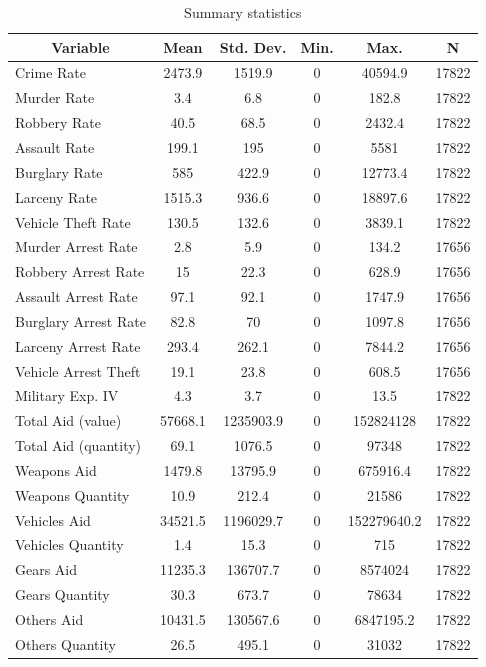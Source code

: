 
\begin{table}[htbp]\centering \caption{Summary statistics \label{sumstat}}
\begin{tabular}{l c c c c c}\hline\hline
\multicolumn{1}{c}{\textbf{Variable}} & \textbf{Mean}
 & \textbf{Std. Dev.}& \textbf{Min.} &  \textbf{Max.} & \textbf{N}\\ \hline
Crime Rate & 2473.9 & 1519.9 & 0 & 40594.9 & 17822\\
Murder Rate & 3.4 & 6.8 & 0 & 182.8 & 17822\\
Robbery Rate & 40.5 & 68.5 & 0 & 2432.4 & 17822\\
Assault Rate & 199.1 & 195 & 0 & 5581 & 17822\\
Burglary Rate & 585 & 422.9 & 0 & 12773.4 & 17822\\
Larceny Rate & 1515.3 & 936.6 & 0 & 18897.6 & 17822\\
Vehicle Theft Rate & 130.5 & 132.6 & 0 & 3839.1 & 17822\\
Murder Arrest Rate & 2.8 & 5.9 & 0 & 134.2 & 17656\\
Robbery Arrest Rate & 15 & 22.3 & 0 & 628.9 & 17656\\
Assault Arrest Rate & 97.1 & 92.1 & 0 & 1747.9 & 17656\\
Burglary Arrest Rate & 82.8 & 70 & 0 & 1097.8 & 17656\\
Larceny Arrest Rate & 293.4 & 262.1 & 0 & 7844.2 & 17656\\
Vehicle Arrest Theft & 19.1 & 23.8 & 0 & 608.5 & 17656\\
Military Exp. IV & 4.3 & 3.7 & 0 & 13.5 & 17822\\
Total Aid (value) & 57668.1 & 1235903.9 & 0 & 152824128 & 17822\\
Total Aid (quantity) & 69.1 & 1076.5 & 0 & 97348 & 17822\\
Weapons Aid & 1479.8 & 13795.9 & 0 & 675916.4 & 17822\\
Weapons Quantity & 10.9 & 212.4 & 0 & 21586 & 17822\\
Vehicles Aid & 34521.5 & 1196029.7 & 0 & 152279640.2 & 17822\\
Vehicles Quantity & 1.4 & 15.3 & 0 & 715 & 17822\\
Gears Aid & 11235.3 & 136707.7 & 0 & 8574024 & 17822\\
Gears Quantity & 30.3 & 673.7 & 0 & 78634 & 17822\\
Others Aid & 10431.5 & 130567.6 & 0 & 6847195.2 & 17822\\
Others Quantity & 26.5 & 495.1 & 0 & 31032 & 17822\\

\end{tabular}
\end{table}
